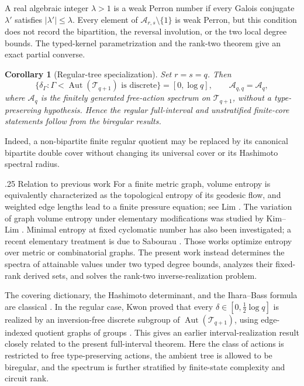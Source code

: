 \documentclass[11pt]{amsart}
\makeatletter
\def\paragraph{\@startsection{paragraph}{4}%
  \z@{.65\linespacing\@plus.45\linespacing}%
  {.25\linespacing}%
  {\normalfont\bfseries}}
\theoremstyle{plain}
\newtheorem{corollary}[theorem]{Corollary}
\theoremstyle{definition}
\theoremstyle{remark}
\newcommand{\T}{\mathcal T}
\newcommand{\Aut}{\operatorname{Aut}}
\newcommand{\cA}{\mathcal A}
\makeatother
\begin{document}
A real algebraic integer \(\lambda>1\) is a weak Perron number if every
Galois conjugate \(\lambda'\) satisfies \(|\lambda'|\leq\lambda\).  Every
element of \(\cA_{r,s}\setminus\{1\}\) is weak Perron, but this condition
does not record the bipartition, the reversal involution, or the two local
degree bounds.  The typed-kernel parametrization and the rank-two theorem
give an exact partial converse.

\begin{corollary}[Regular-tree specialization]\label{cor:intro-regular}
Set \(r=s=q\).  Then
\[
  \{\delta_\Gamma:\Gamma<\Aut(\T_{q+1})\text{ is discrete}\}
  =[0,\log q],
  \qquad
  \cA_{q,q}=\cA_q,
\]
where \(\cA_q\) is the finitely generated free-action spectrum on
\(\T_{q+1}\), without a type-preserving hypothesis.  Hence the regular
full-interval and unstratified finite-core statements follow from the
biregular results.
\end{corollary}

Indeed, a non-bipartite finite regular quotient may be replaced by its
canonical bipartite double cover without changing its universal cover or
its Hashimoto spectral radius.



\paragraph{Relation to previous work}
For a finite metric graph, volume entropy is equivalently characterized as
the topological entropy of its geodesic flow, and weighted edge lengths lead
to a finite pressure equation; see Lim \cite{Lim2008}.  The variation of
graph volume entropy under elementary modifications was studied by
Kim--Lim \cite{KimLim2020}.  Minimal entropy at fixed cyclomatic number has
also been investigated; a recent elementary treatment is due to Sabourau
\cite{Sabourau2026}.  Those works optimize entropy over metric or
combinatorial graphs.  The present work instead determines the spectra of
attainable values under two typed degree bounds, analyzes their fixed-rank
derived sets, and solves the rank-two inverse-realization problem.

The covering dictionary, the Hashimoto determinant, and the Ihara--Bass
formula are classical \cite{SerreTrees,Hashimoto1989,Bass1992,
StarkTerras1996,Terras2010}.
In the regular case, Kwon proved that every
\(\delta\in[0,\frac12\log q]\) is realized by an inversion-free discrete
subgroup of \(\Aut(\T_{q+1})\), using edge-indexed quotient graphs of groups
\cite{Kwon2019}.  This gives an earlier interval-realization result closely
related to the present full-interval theorem.  Here the class of actions is
restricted to free type-preserving actions, the ambient tree is allowed to be
biregular, and the spectrum is
further stratified by finite-state complexity and circuit rank.
\end{document}
